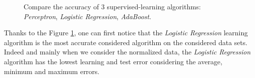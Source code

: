 \documentclass[12pt]{article}											%
\begin{document}
\begin{figure}[t]
\begin{center}
	\caption{Compare the accuracy of 3 supervised-learning algorithms: \emph{Perceptron}, \emph{Logistic Regression}, \emph{AdaBoost}.}
	\label{learningAlgoComparison.png}
\end{center}
\end{figure}


Thanks to the Figure  \ref{learningAlgoComparison.png}, one can first notice that the \emph{Logistic Regression} learning algorithm is the most accurate considered algorithm on the considered data sets.   Indeed and mainly when we consider the normalized data, the \emph{Logistic Regression} algorithm has the lowest learning and test error considering the average, minimum and maximum errors.\\
\end{document}
